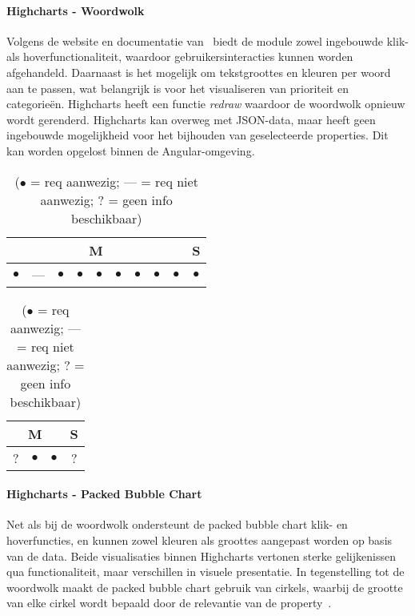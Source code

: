 \paragraph{Highcharts - Woordwolk}
Volgens de website en documentatie van~\textcite{Highcharts2009,Highcharts2009a} biedt de module zowel ingebouwde klik- als hoverfunctionaliteit, waardoor gebruikersinteracties kunnen worden afgehandeld. Daarnaast is het mogelijk om tekstgroottes en kleuren per woord aan te passen, wat belangrijk is voor het visualiseren van prioriteit en categorieën. Highcharts heeft een functie \textit{redraw} waardoor de woordwolk opnieuw wordt gerenderd. Highcharts kan overweg met JSON-data, maar heeft geen ingebouwde mogelijkheid voor het bijhouden van geselecteerde properties. Dit kan worden opgelost binnen de Angular-omgeving.

\begin{table}[htbp]
    \centering
    \begin{minipage}{0.48\textwidth}
        \centering
        \begin{tabular}{|ccccccccc|c|}
            \hline
            \multicolumn{9}{|c|}{M} & \multicolumn{1}{c|}{S} \\
            \midrule
            $\bullet$ & --- & $\bullet$ & $\bullet$ & $\bullet$ & $\bullet$ & $\bullet$ & $\bullet$ & $\bullet$ & $\bullet$ \\
            \bottomrule
        \end{tabular}
        \caption{Highcharts Woordwolk - Functionele requirements}
    \end{minipage}
    \hfill
    \begin{minipage}{0.48\textwidth}
        \centering
        \begin{tabular}{|ccc|c|}
            \hline
            \multicolumn{3}{|c|}{M} & \multicolumn{1}{c|}{S} \\
            \midrule
            ? & $\bullet$ & $\bullet$ & ? \\
            \bottomrule
        \end{tabular}
        \caption{Highcharts Woordwolk - Niet-functionele requirements}
    \end{minipage}
    \caption*{($\bullet$ = req aanwezig; --- = req niet aanwezig; ? = geen info beschikbaar)}
\end{table}

\paragraph{Highcharts - Packed Bubble Chart}
Net als bij de woordwolk ondersteunt de packed bubble chart klik- en hoverfuncties, en kunnen zowel kleuren als groottes aangepast worden op basis van de data. Beide visualisaties binnen Highcharts vertonen sterke gelijkenissen qua functionaliteit, maar verschillen in visuele presentatie. In tegenstelling tot de woordwolk maakt de packed bubble chart gebruik van cirkels, waarbij de grootte van elke cirkel wordt bepaald door de relevantie van de property~\autocite{Highcharts2009,Highcharts2009a}.

